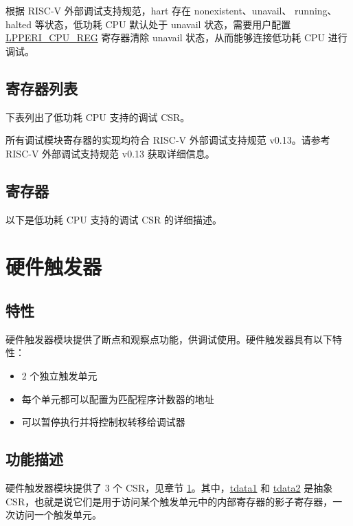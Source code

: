 \documentclass[main\_\_CN.tex]{subfiles}
\begin{document}
根据 RISC-V 外部调试支持规范，hart 存在 nonexistent、unavail、 running、halted 等状态，低功耗 CPU 默认处于 unavail 状态，需要用户配置 \hyperref[regdesc:LPPERICPUREG]{LPPERI\_CPU\_REG} 寄存器清除 unavail 状态，从而能够连接低功耗 CPU 进行调试。

\subsection{寄存器列表}

下表列出了低功耗 CPU 支持的调试 CSR。



所有调试模块寄存器的实现均符合 RISC-V 外部调试支持规范 v0.13。请参考 RISC-V 外部调试支持规范 v0.13 获取详细信息。

\subsection{寄存器}
以下是低功耗 CPU 支持的调试 CSR 的详细描述。




\section{硬件触发器}\label{sec:ulp-trigger}

\subsection{特性}
硬件触发器模块提供了断点和观察点功能，供调试使用。硬件触发器具有以下特性：

\begin{itemize}
    \item 2 个独立触发单元
    \item 每个单元都可以配置为匹配程序计数器的地址
    \item 可以暂停执行并将控制权转移给调试器

\end{itemize}

\subsection{功能描述}
\label{sec:ulp-hwt-func-descr}

硬件触发器模块提供了 3 个 CSR，见章节 \ref{sec:ulp-trigger}。其中，\hyperref[regdesc:LPTDATA1]{tdata1} 和 \hyperref[regdesc:LPTDATA2]{tdata2} 是抽象 CSR，也就是说它们是用于访问某个触发单元中的内部寄存器的影子寄存器，一次访问一个触发单元。
\end{document}
